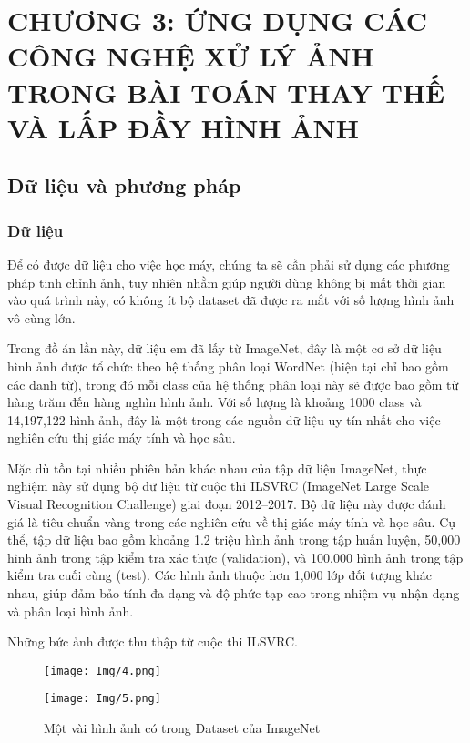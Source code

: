\documentclass[12pt]{report}
\begin{document}
\chapter{CHƯƠNG 3: ỨNG DỤNG CÁC CÔNG NGHỆ XỬ LÝ ẢNH TRONG BÀI TOÁN THAY THẾ VÀ LẤP ĐẦY HÌNH ẢNH}

\section{Dữ liệu và phương pháp}

\subsection{Dữ liệu}

Để có được dữ liệu cho việc học máy, chúng ta sẽ cần phải sử dụng các phương pháp tinh chỉnh ảnh, tuy nhiên nhằm giúp người dùng không bị mất thời gian vào quá trình này, có không ít bộ dataset đã được ra mắt với số lượng hình ảnh vô cùng lớn.

Trong đồ án lần này, dữ liệu em đã lấy từ ImageNet, đây là một cơ sở dữ liệu hình ảnh được tổ chức theo hệ thống phân loại WordNet (hiện tại chỉ bao gồm các danh từ), trong đó mỗi class của hệ thống phân loại này sẽ được bao gồm từ hàng trăm đến hàng nghìn hình ảnh. Với số lượng là khoảng 1000 class và 14,197,122 hình ảnh, đây là một trong các nguồn dữ liệu uy tín nhất cho việc nghiên cứu thị giác máy tính và học sâu.

Mặc dù tồn tại nhiều phiên bản khác nhau của tập dữ liệu ImageNet, thực nghiệm này sử dụng bộ dữ liệu từ cuộc thi ILSVRC (ImageNet Large Scale Visual Recognition Challenge) giai đoạn 2012–2017. Bộ dữ liệu này được đánh giá là tiêu chuẩn vàng trong các nghiên cứu về thị giác máy tính và học sâu. Cụ thể, tập dữ liệu bao gồm khoảng 1.2 triệu hình ảnh trong tập huấn luyện, 50,000 hình ảnh trong tập kiểm tra xác thực (validation), và 100,000 hình ảnh trong tập kiểm tra cuối cùng (test). Các hình ảnh thuộc hơn 1,000 lớp đối tượng khác nhau, giúp đảm bảo tính đa dạng và độ phức tạp cao trong nhiệm vụ nhận dạng và phân loại hình ảnh.


Những bức ảnh được thu thập từ cuộc thi ILSVRC.

\vspace{1em}
\noindent
\begin{figure}[H]
    \centering
    \begin{minipage}{0.49\textwidth}
        \texttt{[image: Img/4.png]}
    \end{minipage}
    \hfill
    \begin{minipage}{0.49\textwidth}
        \texttt{[image: Img/5.png]}
    \end{minipage}
    \caption{Một vài hình ảnh có trong Dataset của ImageNet}
    \label{fig:imagenet_samples}
\end{figure}
\end{document}
